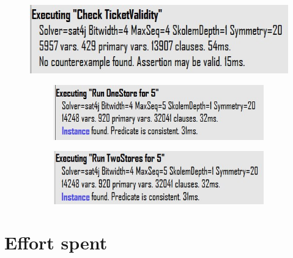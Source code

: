 \documentclass[]{article}
\begin{document}
			\begin{figure}[H]

								\includegraphics[scale=0.9]{TicketValidity.jpg}
										\begin{figure}[H]

								\includegraphics[scale=0.9]{OneStorePred.jpg}
								
	\end{figure}
			\begin{figure}[H]

								\includegraphics[scale=0.9]{TwoStoresPred.jpg}
								
	\end{figure}
								
	\end{figure}

	
	\newpage
	\section{Effort spent}
	
\end{document}
